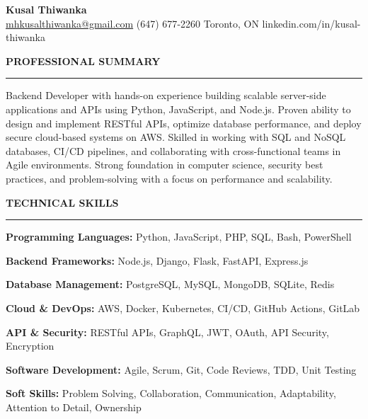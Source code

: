 \documentclass[10pt,letterpaper]{article}
\begin{document}
\begin{center}
{\LARGE\textbf{Kusal Thiwanka}}\\[3pt]
\href{mailto:mhkusalthiwanka@gmail.com}{mhkusalthiwanka@gmail.com}\hspace{2em}%
(647) 677{-}2260\hspace{2em}%
Toronto, ON\hspace{2em}
linkedin.com/in/kusal-thiwanka
\end{center}

\vspace{6pt}

\textbf{PROFESSIONAL SUMMARY}\\[-8pt]
\noindent\rule{\textwidth}{1pt}

\vspace{-2pt}

Backend Developer with hands-on experience building scalable server-side applications and APIs using Python, JavaScript, and Node.js. Proven ability to design and implement RESTful APIs, optimize database performance, and deploy secure cloud-based systems on AWS. Skilled in working with SQL and NoSQL databases, CI/CD pipelines, and collaborating with cross-functional teams in Agile environments. Strong foundation in computer science, security best practices, and problem-solving with a focus on performance and scalability.

\vspace{8pt}

\textbf{TECHNICAL SKILLS}\\[-8pt]
\noindent\rule{\textwidth}{1pt}

\vspace{-2pt}

\textbf{Programming Languages:} Python, JavaScript, PHP, SQL, Bash, PowerShell

\textbf{Backend Frameworks:} Node.js, Django, Flask, FastAPI, Express.js

\textbf{Database Management:} PostgreSQL, MySQL, MongoDB, SQLite, Redis

\textbf{Cloud \& DevOps:} AWS, Docker, Kubernetes, CI/CD, GitHub Actions, GitLab

\textbf{API \& Security:} RESTful APIs, GraphQL, JWT, OAuth, API Security, Encryption

\textbf{Software Development:} Agile, Scrum, Git, Code Reviews, TDD, Unit Testing

\textbf{Soft Skills:} Problem Solving, Collaboration, Communication, Adaptability, Attention to Detail, Ownership
\end{document}
